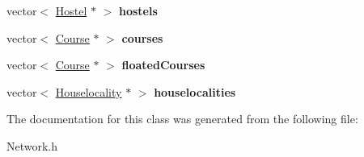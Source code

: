 \begin{DoxyCompactItemize}
\item 
\hypertarget{classUniversity_a7be5a63c0664167140ab58ce4c51b865}{vector$<$ \hyperlink{classHostel}{\-Hostel} $\ast$ $>$ {\bfseries hostels}}\label{classUniversity_a7be5a63c0664167140ab58ce4c51b865}

\item 
\hypertarget{classUniversity_a73d8632a19478bc53a13365a3ca37cf6}{vector$<$ \hyperlink{classCourse}{\-Course} $\ast$ $>$ {\bfseries courses}}\label{classUniversity_a73d8632a19478bc53a13365a3ca37cf6}

\item 
\hypertarget{classUniversity_ac54a54cd11d93c8e4c4b05b08b98fdf5}{vector$<$ \hyperlink{classCourse}{\-Course} $\ast$ $>$ {\bfseries floated\-Courses}}\label{classUniversity_ac54a54cd11d93c8e4c4b05b08b98fdf5}

\item 
\hypertarget{classUniversity_a16643821059193af583acacd41e39b36}{vector$<$ \hyperlink{classHouselocality}{\-Houselocality} $\ast$ $>$ {\bfseries houselocalities}}\label{classUniversity_a16643821059193af583acacd41e39b36}

\end{DoxyCompactItemize}


\-The documentation for this class was generated from the following file\-:\begin{DoxyCompactItemize}
\item 
\-Network.\-h\end{DoxyCompactItemize}
